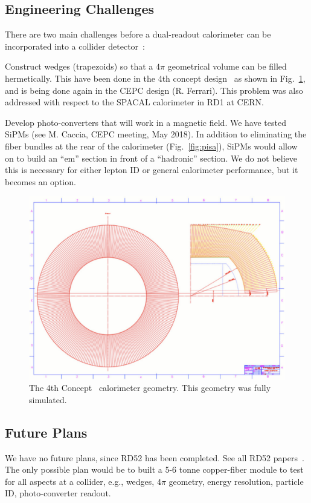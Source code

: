 \subsection{Engineering Challenges}

There are two main challenges before a dual-readout calorimeter can be incorporated into a collider detector~\cite{Hauptman_CEPC}:

\begin{description}

\item Construct wedges (trapezoids) so that a $4 \pi$ geometrical volume can be filled hermetically. This have been done in the 4th concept design~\cite{fourthConcept} as shown in Fig.~\ref{fig:hcalor}, and is being done again in the CEPC design (R. Ferrari).  This problem was also addressed with respect to the SPACAL calorimeter in RD1 at CERN.

\item Develop photo-converters that will work in a magnetic field.  We have tested SiPMs (see M. Caccia, CEPC meeting, May 2018).  In addition to eliminating the fiber bundles at the rear of the calorimeter (Fig.~\ref{fig:pisa}), SiPMs would allow on to build an ``em'' section in front of a ``hadronic'' section.  We do not believe this is necessary for either lepton ID or general calorimeter performance, but it becomes an option. 
 
\end{description}
 
\begin{figure}
  \centering
  \includegraphics[width=0.5\linewidth]{Calorimeter/DualReadout/hcalor}
  \caption{The 4th Concept~\cite{fourthConcept} calorimeter geometry. This geometry was fully simulated. }
  \label{fig:hcalor}
\end{figure}

\subsection{Future Plans}

We have no future plans, since RD52 has been completed. See all RD52 papers~\cite{dreamCollaboration}. The only possible plan would be to built a 5-6 tonne copper-fiber module to test for all aspects at a collider, e.g., wedges, $4 \pi$ geometry, energy resolution, particle ID, photo-converter readout.  
